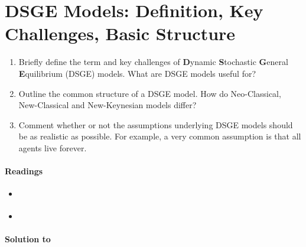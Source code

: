 \section[DSGE Models: Definition, Key Challenges, Basic Structure]{DSGE Models: Definition, Key Challenges, Basic Structure\label{ex:DSGEModelsDefinitionChallengesStructure}}
\begin{enumerate}
\item Briefly define the term and key challenges of \textbf{D}ynamic \textbf{S}tochastic \textbf{G}eneral \textbf{E}quilibrium (DSGE) models.
What are DSGE models useful for?
\item Outline the common structure of a DSGE model.
How do Neo-Classical, New-Classical and New-Keynesian models differ?
\item Comment whether or not the assumptions underlying DSGE models should be as realistic as possible.
For example, a very common assumption is that all agents live forever.
\end{enumerate}

\paragraph{Readings}
\begin{itemize}
\item \textcite[Ch.~1]{Fernandez-Villaverde.Rubio-Ramirez.Schorfheide_2016_SolutionEstimationMethods}
\item \textcite[Ch.~1]{Torres_2013_IntroductionDynamicMacroeconomic}
\end{itemize}

\begin{solution}\textbf{Solution to }
\ifDisplaySolutions

\fi
\newpage
\end{solution}